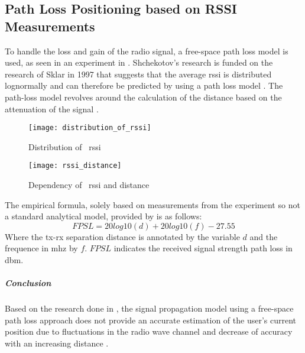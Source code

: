 \subsection{Path Loss Positioning based on RSSI Measurements}
To handle the loss and gain of the radio signal, a free-space path loss model is used, as seen in an experiment in \cite[p.178]{Shchekotov}. Shchekotov's research is funded on the research of Sklar in 1997 that suggests that the average \acrshort{rssi} is distributed lognormally and can therefore be predicted by using a path loss model \cite[p.16]{S2016}. The path-loss model revolves around the calculation of the distance based on the attenuation of the signal \cite{Mautza}.
\begin{figure}[h!]
\centering
\texttt{[image: distribution\_of\_rssi]}
\caption{Distribution of ~\acrlong{rssi} ~\cite[p.16]{S2016}}
\label{fig:distribution_rssi}
\end{figure}
\begin{figure}[h!]
\centering
\texttt{[image: rssi\_distance]}
\caption{Dependency of ~\acrlong{rssi} and distance ~\cite[p.61]{Mautz}}
\label{fig:rssi_distance}
\end{figure}
The empirical formula, solely based on measurements from the experiment so not a standard analytical model, provided by \cite{S2016} is as follows:
\[
FPSL = 20log10(d) + 20log10(f) - 27.55
\]
Where the \acrlong{tx}-\acrlong{rx} separation distance is annotated by the variable $d$ and the frequence in \acrfull{mhz} by $f$. $FPSL$ indicates the received signal strength path loss in \acrfull{dbm}.
\subparagraph{Conclusion}
Based on the research done in \cite{Shchekotov}, the signal propagation model using a free-space path loss approach does not provide an accurate estimation of the user's current position due to fluctuations in the radio wave channel and decrease of accuracy with an increasing distance \cite[p~61]{Mautz} \cite[p~2]{Loy2018}.
